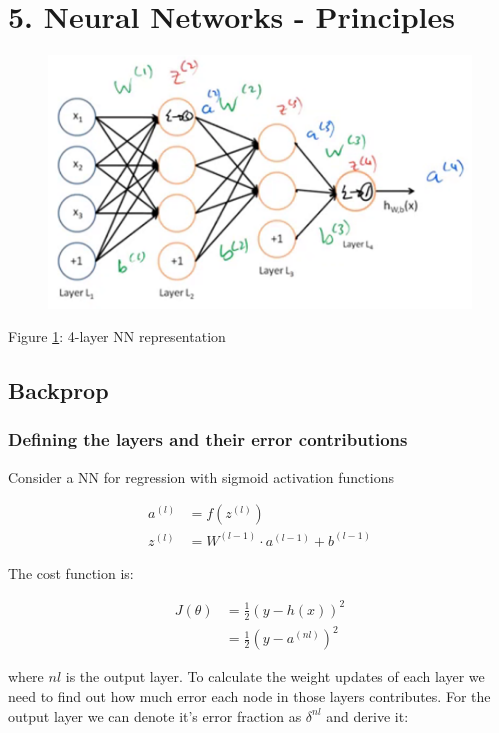\documentclass[]{article}
\begin{document}
	
	\section{5. Neural Networks - Principles}
		\begin{figure}[h!]
			\begin{center}
				\includegraphics[width=0.5\linewidth]{./images/4layerNN.png}
				\label{fig:nn}
			\end{center}
		\end{figure}
		
		\begin{center}
			Figure \ref{fig:nn}: 4-layer NN representation
		\end{center}
		
		
		
		\subsection{Backprop}
			\subsubsection{Defining the layers and their error contributions}
				\textnormal{Consider a NN for regression with sigmoid activation functions}
			
				\begin{align}
					a^{(l)} &=  f(z^{(l)})\\
					z^{(l)} &= W^{(l-1)} \cdot a^{(l-1)} + b^{(l-1)}
				\end{align}
				
				
				\textnormal{The cost function is:}
				
				\begin{align}
				J(\theta) &= \frac{1}{2}(y - h(x) )^2 \\
				&= \frac{1}{2}(y - a^{(nl)} )^2
				\end{align}
	
							
				\textnormal{where $nl$ is the output layer. To calculate the weight updates of each layer we need to find out how much error each node in those layers contributes.}
				\textnormal{For the output layer we can denote it's error fraction as $\delta^{nl}$ and derive it:}
				
\end{document}
